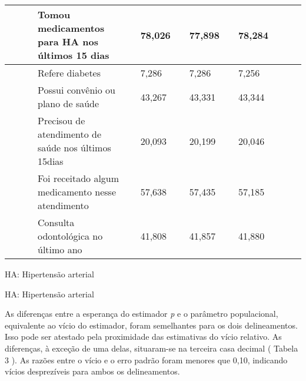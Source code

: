 \documentclass{article}
\begin{document}
\begin{tabular}{| l | l | l | l | l | l | l | l | l || l | l | l | l |}
 & 
 & %
 & Tomou medicamentos para HA nos últimos 15 dias
 & %
 & 78,026
 & %
 & 77,898
 & %
 & 78,284
\\ \hline 

 & 
 & %
 & Refere diabetes
 & %
 & 7,286
 & %
 & 7,286
 & %
 & 7,256
\\ \hline 

 & 
 & %
 & Possui convênio ou plano de saúde
 & %
 & 43,267
 & %
 & 43,331
 & %
 & 43,344
\\ \hline 

 & 
 & %
 & Precisou de atendimento de saúde nos últimos 15dias
 & %
 & 20,093
 & %
 & 20,199
 & %
 & 20,046
\\ \hline 

 & 
 & %
 & Foi receitado algum medicamento nesse atendimento
 & %
 & 57,638
 & %
 & 57,435
 & %
 & 57,185
\\ \hline 

 & 
 & %
 & Consulta odontológica no último ano
 & %
 & 41,808
 & %
 & 41,857
 & %
 & 41,880
\\ \hline 


\end{tabular}

HA: Hipertensão arterial


HA: Hipertensão arterial

As diferenças entre a esperança do estimador %
\textit{p}
 e o parâmetro populacional, equivalente ao vício do estimador, foram semelhantes para os dois delineamentos. Isso pode ser atestado pela proximidade das estimativas do vício relativo. As diferenças, à exceção de uma delas, situaram-se na terceira casa decimal (%
Tabela 3%
). As razões entre o vício e o erro padrão foram menores que 0,10, indicando vícios desprezíveis para ambos os delineamentos.
\end{document}
